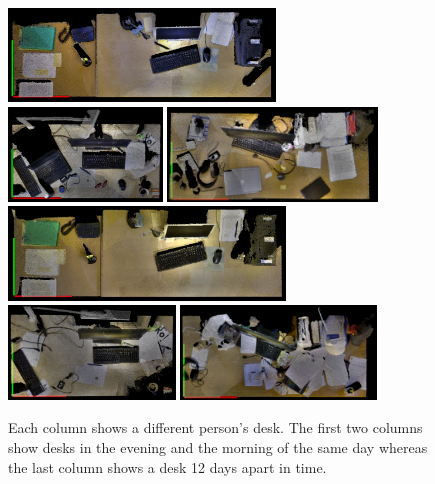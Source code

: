 \documentclass[letterpaper, 10 pt, conference]{ieeeconf}  %
\begin{document}
\begin{figure}
\begin{center}
\includegraphics[height=2.5cm]{David_Mor_131110} \quad
\includegraphics[height=2.5cm]{Nils_Mor_131111} \quad
\includegraphics[height=2.5cm]{Puren_Eve_131029}\\ \smallskip
\includegraphics[height=2.5cm]{David_Eve_131110} \enskip
\includegraphics[height=2.5cm]{Nils_Eve_131111} \enskip
\includegraphics[height=2.5cm]{Puren_Mor_131110}
\label{fig:examplescenes}
\caption{Each column shows a different person's desk. The first two columns show desks in the evening and the morning of the same day whereas the last column shows a desk 12 days apart in time.}
\end{center}
\end{figure}
\end{document}
